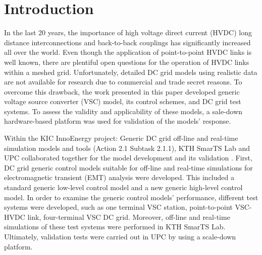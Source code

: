 \documentclass[conference]{IEEEtran}
\begin{document}




%
\IEEEpeerreviewmaketitle



\section{Introduction}
In the last 20 years, the importance of high voltage direct current (HVDC) long distance interconnections and back-to-back couplings has significantly increased all over the world. Even though the application of point-to-point HVDC links is well known, there are plentiful open questions for the operation of HVDC links within a meshed grid. Unfortunately, detailed DC grid models using realistic data are not available for research due to commercial and trade secret reasons. To overcome this drawback, the work presented in this paper developed generic voltage source converter (VSC) model, its control schemes, and DC grid test systems. To assess the validity and applicability of these models, a sale-down hardware-based platform was used for validation of the models' response. 

Within the KIC InnoEnergy project: Generic DC grid off-line and real-time simulation models and tools (Action 2.1 Subtask 2.1.1), KTH SmarTS Lab and UPC collaborated together for the model development and its validation .
First, DC grid generic control models suitable for off-line and real-time simulations for electromagnetic transient (EMT) analysis were developed. This included a standard generic low-level control model and a new generic high-level control model. In order to examine the generic control models' performance, different test systems were developed, such as one terminal VSC station, point-to-point VSC-HVDC link, four-terminal VSC DC grid. Moreover, off-line and real-time simulations of these test systems were performed in KTH SmarTS Lab. 
Ultimately, validation tests were carried out in UPC by using a scale-down platform.
\end{document}
